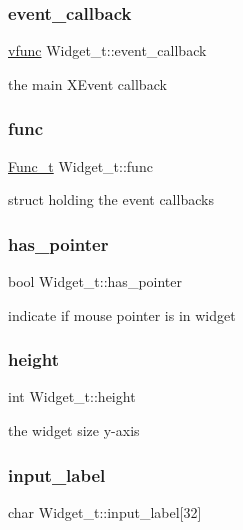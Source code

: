 \subsubsection{\texorpdfstring{event\+\_\+callback}{event\_callback}}
{\footnotesize\ttfamily \hyperlink{xwidget_8h_a6423c133fb634585762a77dda34befab}{vfunc} Widget\+\_\+t\+::event\+\_\+callback}

the main X\+Event callback \mbox{\label{structWidget__t_a225b9a175e132994a5aa73b59a2911ad}} 
\subsubsection{\texorpdfstring{func}{func}}
{\footnotesize\ttfamily \hyperlink{structFunc__t}{Func\+\_\+t} Widget\+\_\+t\+::func}

struct holding the event callbacks \mbox{\label{structWidget__t_ac8c396c698d816afad49fa751c3ca2c8}} 
\subsubsection{\texorpdfstring{has\+\_\+pointer}{has\_pointer}}
{\footnotesize\ttfamily bool Widget\+\_\+t\+::has\+\_\+pointer}

indicate if mouse pointer is in widget \mbox{\label{structWidget__t_a1def6d2237743e75a0b84ca0c34a6834}} 
\subsubsection{\texorpdfstring{height}{height}}
{\footnotesize\ttfamily int Widget\+\_\+t\+::height}

the widget size y-\/axis \mbox{\label{structWidget__t_ac5cb454301472edeb16e563ef2149dbb}} 
\subsubsection{\texorpdfstring{input\+\_\+label}{input\_label}}
{\footnotesize\ttfamily char Widget\+\_\+t\+::input\+\_\+label\mbox{[}32\mbox{]}}

